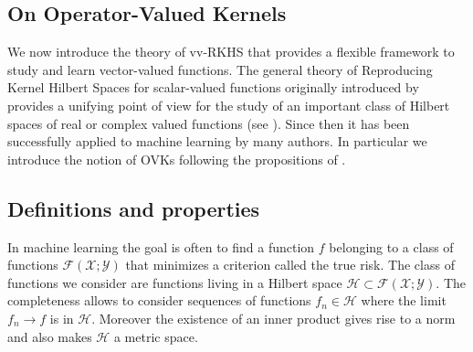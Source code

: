 \documentclass[twoside,11pt]{article}
\begin{document}



\subsection{On Operator-Valued Kernels}
\label{sec:background_on_operator-valued_kernels} We now introduce the theory
of \acf{vv-RKHS} that provides a flexible framework to study and learn
vector-valued functions. The general theory of Reproducing Kernel Hilbert Spaces  for scalar-valued functions
originally introduced by \citet{Aronszajn1950}  provides a unifying point of view
for the study of an important class of Hilbert spaces of real or complex valued
functions (see \citet{Berlinet}). 
 Since then it has
been successfully applied to machine learning by many authors. In particular we
introduce the notion of \aclp{OVK} following the propositions of
\citet{Micchelli2005,carmeli2006vector,Carmeli2010}.
\subsection{Definitions and properties}
\label{subsec:def_properties} In machine learning the goal is often to find a
function $f$ belonging to a class of functions
$\mathcal{F}(\mathcal{X};\mathcal{Y})$ that minimizes a criterion called the
true risk. The class of functions we consider are functions living in a Hilbert
space $\mathcal{H}\subset\mathcal{F}(\mathcal{X};\mathcal{Y})$. The
completeness allows to consider sequences of functions $f_n \in\mathcal{H}$
where the limit $f_n\to f$ is in $\mathcal{H}$. Moreover the existence of an
inner product gives rise to a norm and also makes $\mathcal{H}$ a metric space.
\end{document}
